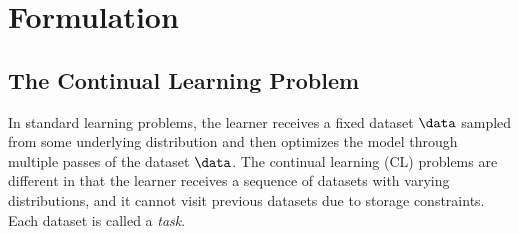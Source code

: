 \section{Formulation}


\subsection{The Continual Learning Problem}

In standard learning problems, the learner receives a fixed dataset $\data$ sampled from some underlying distribution and then optimizes the model through multiple passes of the dataset $\data$. 
The continual learning (CL) problems are different in that the learner receives a sequence of datasets with varying distributions, and it cannot visit previous datasets due to storage constraints. Each dataset is called a \emph{task}.

